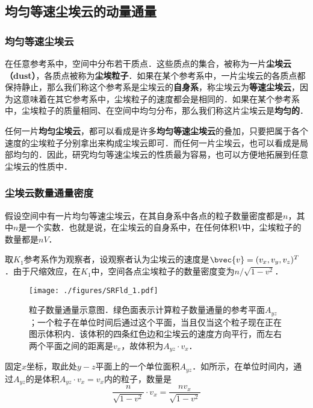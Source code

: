 


\subsection{均匀等速尘埃云的动量通量}

\subsubsection{均匀等速尘埃云}

在任意参考系中，空间中分布若干质点．这些质点的集合，被称为一片\textbf{尘埃云（dust）}，各质点被称为\textbf{尘埃粒子}．如果在某个参考系中，一片尘埃云的各质点都保持静止，那么我们称这个参考系是尘埃云的\textbf{自身系}，称尘埃云为\textbf{等速尘埃云}，因为这意味着在其它参考系中，尘埃粒子的速度都会是相同的．如果在某个参考系中，尘埃粒子的质量相同、在空间中均匀分布，那么我们称这片尘埃云是\textbf{均匀的}．

任何一片\textbf{均匀尘埃云}，都可以看成是许多\textbf{均匀等速尘埃云}的叠加，只要把属于各个速度的尘埃粒子分别拿出来构成尘埃云即可．而任何一片尘埃云，也可以看成是局部均匀的．因此，研究均匀等速尘埃云的性质最为容易，也可以方便地拓展到任意尘埃云的性质中．

\subsubsection{尘埃云数量通量密度}

假设空间中有一片均匀等速尘埃云，在其自身系中各点的粒子数量密度都是$n$，其中$n$是一个实数．也就是说，在尘埃云的自身系中，在任何体积$V$中，尘埃粒子的数量都是$nV$．

取$K_1$参考系作为观察者，设观察者认为尘埃云的速度是$\bvec{v}=(v_x, v_y, v_z)^T$．由于尺缩效应，在$K_1$中，空间各点尘埃粒子的数量密度变为$n/\sqrt{1-v^2}$．

\begin{figure}[ht]
\centering
\texttt{[image: ./figures/SRFld\_1.pdf]}
\caption{粒子数量通量示意图．绿色面表示计算粒子数量通量的参考平面$A_{yz}$；一个粒子在单位时间后通过这个平面，当且仅当这个粒子现在正在图示体积内．该体积的四条红色边和尘埃云的速度方向平行，而左右两个平面之间的距离是$v_x$，故体积为$A_{yz}\cdot v_x$．} \label{SRFld_fig1}
\end{figure}

固定$x$坐标，取此处$y-z$平面上的一个单位面积$A_{yz}$．如所示，在单位时间内，通过$A_{yz}$的是体积$A_{yz}\cdot v_x=v_x$内的粒子，数量是
\begin{equation}
\frac{n}{\sqrt{1-v^2}}\cdot v_x=\frac{nv_x}{\sqrt{1-v^2}}
\end{equation}

